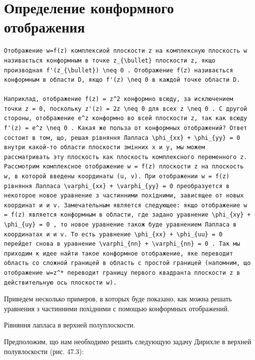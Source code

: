 \documentclass[
]{article}
\begin{document}
{\section{Определение конформного
отображения}\label{ux43eux43fux440ux435ux434ux435ux43bux435ux43dux438ux435-ux43aux43eux43dux444ux43eux440ux43cux43dux43eux433ux43e-ux43eux442ux43eux431ux440ux430ux436ux435ux43dux438ux44f}

\begin{verbatim}
Отображение w=f(z) комплексиой плоскости z на комплексную плоскость w називається конформным в точке z_{\bullet} плоскости z, якщо производная f'(z_{\bullet}) \neq 0 . Отображение f(z) називається конформным в области D, якщо f'(z) \neq 0 в каждой точке области D.

Наприклад, отображение f(z) = z^2 конформно всюду, за исключением точки z = 0, поскольку z'(z) = 2z \neq 0 для всех z \neq 0 . C другой стороны, отображение e^z конформно во всей плоскости z, так как всюду f'(z) = e^z \neq 0 . Какая же польза от конформных отображений? Ответ состоит в том, що, решая рівняння Лапласа \phi_{xx} + \phi_{yy} = 0 внутри какой-то области плоскости змінних x и y, мы можем рассматривать эту плоскость как плоскость комплексного переменного z. Рассмотрим комплексное отображение w = f(z) плоскости z на плоскость w, в которой введены координаты (u, v). При отображении w = f(z) рівняння Лапласа \varphi_{xx} + \varphi_{yy} = 0 преобразуется в некоторое новое уравнение з частинними похідними, зависящее от новых координат и и v. Замечательным является следующее: якщо отображение w = f(z) является конформным в области, где задано уравнение \phi_{xy} + \phi_{uy} = 0 , то новое уравнение також буде уравнением Лапласа в координатах и и v. To есть уравнение \phi_{xx} + \phi_{uu} = 0 перейдет снова в уравнение \varphi_{nn} + \varphi_{nn} = 0 . Так мы приходим к идее найти такое конформное отображение, яке переводит область со сложной границей в область с простой границей (напомним, що отображение w=z^* переводит границу первого квадранта плоскости z в действительную ось плоскости w).
\end{verbatim}

Приведем несколько примеров, в которых буде показано, как можна решать
уравнения з частинними похідними с помощью конформных отображений.

Рівняння лапласа в верхней полуплоскости.

Предположим, що нам необходимо решить следующую задачу Дирихле в верхней
полувлоскости (рис. 47.3):

}
\end{document}

